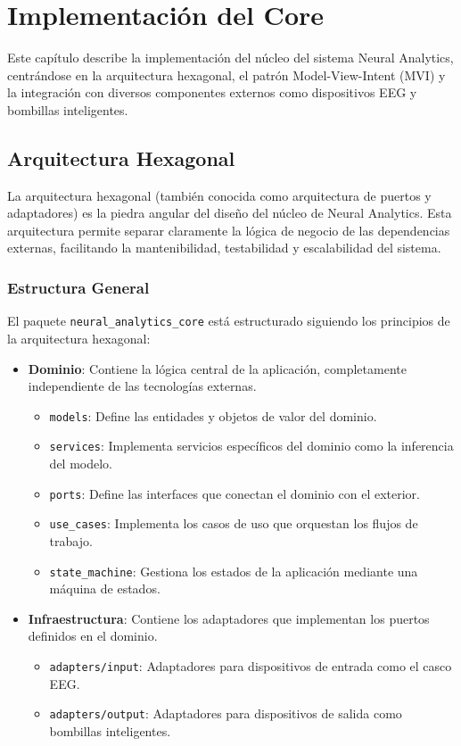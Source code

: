 \chapter{Implementación del Core}\label{ch:core_implementing}

Este capítulo describe la implementación del núcleo del sistema Neural Analytics, centrándose en la arquitectura hexagonal, el patrón Model-View-Intent (MVI) y la integración con diversos componentes externos como dispositivos EEG y bombillas inteligentes.

\section{Arquitectura Hexagonal}

La arquitectura hexagonal (también conocida como arquitectura de puertos y adaptadores) es la piedra angular del diseño del núcleo de Neural Analytics. Esta arquitectura permite separar claramente la lógica de negocio de las dependencias externas, facilitando la mantenibilidad, testabilidad y escalabilidad del sistema.

\subsection{Estructura General}

El paquete \texttt{neural\_analytics\_core} está estructurado siguiendo los principios de la arquitectura hexagonal:

\begin{itemize}
    \item \textbf{Dominio}: Contiene la lógica central de la aplicación, completamente independiente de las tecnologías externas.
    \begin{itemize}
        \item \texttt{models}: Define las entidades y objetos de valor del dominio.
        \item \texttt{services}: Implementa servicios específicos del dominio como la inferencia del modelo.
        \item \texttt{ports}: Define las interfaces que conectan el dominio con el exterior.
        \item \texttt{use\_cases}: Implementa los casos de uso que orquestan los flujos de trabajo.
        \item \texttt{state\_machine}: Gestiona los estados de la aplicación mediante una máquina de estados.
    \end{itemize}
    
    \item \textbf{Infraestructura}: Contiene los adaptadores que implementan los puertos definidos en el dominio.
    \begin{itemize}
        \item \texttt{adapters/input}: Adaptadores para dispositivos de entrada como el casco EEG.
        \item \texttt{adapters/output}: Adaptadores para dispositivos de salida como bombillas inteligentes.
    \end{itemize}
\end{itemize}

